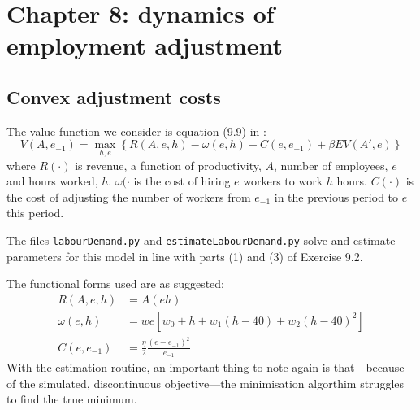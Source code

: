 \section{Chapter 8: dynamics of employment adjustment}

\subsection{Convex adjustment costs} \label{sub:demandconvex}

The value function we consider is equation (9.9) in \citet{adda2003dynamic}:
%
\begin{equation}
	V(A, e_{-1}) = \max_{h,e} \left\{ R(A,e,h) - \omega(e,h) - C(e,e_{-1}) + \beta EV(A', e) \right\}
\end{equation}
%
where \(R(\cdot)\) is revenue, a function of productivity, \(A\), number of employees, \(e\) and hours worked, \(h\). \(\omega(\cdot\) is the cost of hiring \(e\) workers to work \(h\) hours. \(C(\cdot)\) is the cost of adjusting the number of workers from \(e_{-1}\) in the previous period to \(e\) this period.

The files \texttt{labourDemand.py} and \texttt{estimateLabourDemand.py} solve and estimate parameters for this model in line with parts (1) and (3) of Exercise 9.2.

The functional forms used are as suggested:
%
\begin{align}
 R(A,e,h) &=  A(eh) \\
 \omega(e,h) &= we\left[w_0 + h + w_1(h - 40) + w_2(h - 40)^2\right] \\
 C(e,e_{-1}) &= \frac{\eta}{2}\frac{(e - e_{-1})^2}{e_{-1}}
\end{align}
%
With the estimation routine, an important thing to note again is that---because of the simulated, discontinuous objective---the minimisation algorthim struggles to find the true minimum.
